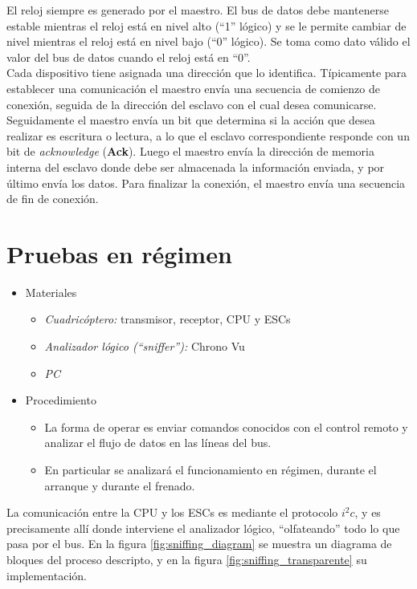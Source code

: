 \documentclass[main]{subfiles}
\begin{document}
El reloj siempre es generado por el maestro. El bus de datos debe mantenerse estable mientras el reloj está en nivel alto (``1'' lógico) y se le permite cambiar de nivel mientras el reloj está en nivel bajo (``0'' lógico). Se toma como dato válido el valor del bus de datos cuando el reloj está en ``0''.\\

Cada dispositivo tiene asignada una direcci\'on que lo identifica. Típicamente para establecer una comunicaci\'on el maestro env\'ia una secuencia de comienzo de conexi\'on, seguida de la direcci\'on del esclavo con el cual desea comunicarse. Seguidamente el maestro env\'ia un bit que determina si la acci\'on que desea realizar es escritura o lectura, a lo que el esclavo correspondiente responde con un bit de \emph{acknowledge} (\textbf{Ack}). Luego el maestro env\'ia la direcci\'on de memoria interna del esclavo donde debe ser almacenada la informaci\'on enviada, y por \'ultimo env\'ia los datos. Para finalizar la conexi\'on, el maestro env\'ia una secuencia de fin de conexi\'on.

\section{Pruebas en r\'egimen}

\begin{itemize}
	\item Materiales
	\begin{itemize}
		\item \emph{Cuadricóptero:} transmisor, receptor, CPU y ESCs
		\item \emph{Analizador lógico (``sniffer''):} Chrono Vu
		\item \emph{PC}
	\end{itemize}
	\item Procedimiento
	\begin{itemize}
		\item La forma de operar es enviar comandos conocidos con el control remoto y analizar el flujo de datos en las l\'ineas del bus.
		\item En particular se analizará el funcionamiento en régimen, durante el arranque y durante el frenado.
	\end{itemize}
\end{itemize}

La comunicación entre la CPU y los ESCs es mediante el protocolo $i^2c$, y es precisamente allí donde interviene el analizador lógico, ``olfateando'' todo lo que pasa por el bus. En la figura \ref{fig:sniffing_diagram} se muestra un diagrama de bloques del proceso descripto, y en la figura \ref{fig:sniffing_transparente} su implementación.
\end{document}
